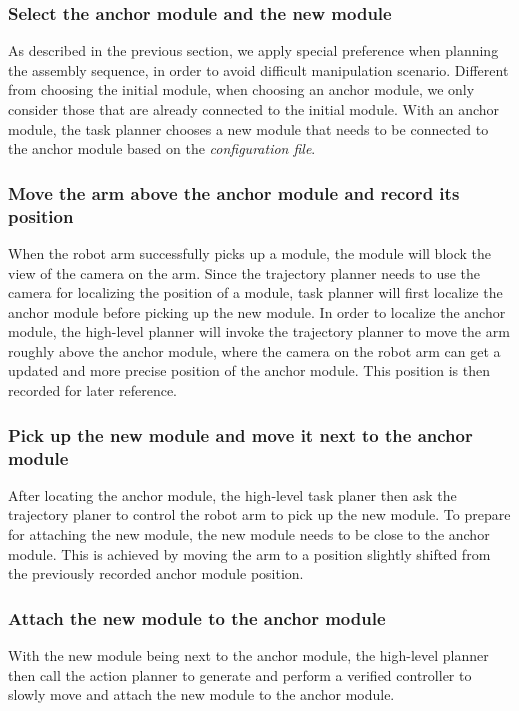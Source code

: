 \subsubsection{Select the anchor module and the new module}\label{sec:nextmodule}
As described in the previous section, we apply special preference when planning the assembly sequence, in order to avoid difficult manipulation scenario.
Different from choosing the initial module, when choosing an anchor module, we only consider those that are already connected to the initial module.
With an anchor module, the task planner chooses a new module that needs to be connected to the anchor module based on the {\it configuration file}.

\subsubsection{Move the arm above the anchor module and record its position}
When the robot arm successfully picks up a module, the module will block the view of the camera on the arm.
Since the trajectory planner needs to use the camera for localizing the position of a module, task planner will first localize the anchor module before picking up the new module.
In order to localize the anchor module, the high-level planner will invoke the trajectory planner to move the arm roughly above the anchor module, where the camera on the robot arm can get a updated and more precise position of the anchor module.
This position is then recorded for later reference.

\subsubsection{Pick up the new module and move it next to the anchor module}
After locating the anchor module, the high-level task planer then ask the trajectory planer to control the robot arm to pick up the new module.
To prepare for attaching the new module, the new module needs to be close to the anchor module.
This is achieved by moving the arm to a position slightly shifted from the previously recorded anchor module position.

\subsubsection{Attach the new module to the anchor module}
With the new module being next to the anchor module, the high-level planner then call the action planner to generate and perform a verified controller to slowly move and attach the new module to the anchor module.

